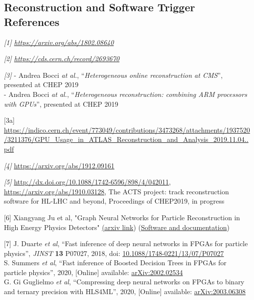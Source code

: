 \documentclass[10pt,a4paper]{article}
\begin{document}
\subsection{Reconstruction and Software Trigger References}\label{references-rst}


\emph{{[}1{]}
\href{https://arxiv.org/abs/1802.08640}{{https://arxiv.org/abs/1802.08640}}}

\emph{{[}2{]}
\href{https://cds.cern.ch/record/2693670}{{https://cds.cern.ch/record/2693670}}}

\emph{{[}3{]}} - Andrea Bocci \emph{at al.}, ``\emph{Heterogeneous
online reconstruction at CMS}'', presented at CHEP 2019\\
- Andrea Bocci \emph{at al.}, ``\emph{Heterogeneous reconstruction:
combining ARM processors with GPUs}'', presented at CHEP 2019

{[}3a{]}
\href{https://indico.cern.ch/event/773049/contributions/3473268/attachments/1937520/3211376/GPU_Usage_in_ATLAS_Reconstruction_and_Analysis_2019.11.04..pdf}{{https://indico.cern.ch/event/773049/contributions/3473268/attachments/1937520/3211376/GPU\_Usage\_in\_ATLAS\_Reconstruction\_and\_Analysis\_2019.11.04..pdf}}

\emph{{[}4{]}}
\href{https://arxiv.org/abs/1912.09161}{{https://arxiv.org/abs/1912.09161}}

\emph{{[}5{]}}
\href{http://dx.doi.org/10.1088/1742-6596/898/4/042011}{{http://dx.doi.org/10.1088/1742-6596/898/4/042011}},
\href{https://arxiv.org/abs/1910.03128}{{https://arxiv.org/abs/1910.03128}},
The ACTS project: track reconstruction software for HL-LHC and beyond,
Proceedings of CHEP2019, in progress

{[}6{]} Xiangyang Ju et al, "Graph Neural Networks for Particle
Reconstruction in High Energy Physics Detectors"
\href{https://arxiv.org/abs/2003.11603}{{(arxiv link}})
(\href{https://github.com/exatrkx/exatrkx-neurips19}{{Software and
documentation}})

{[}7{]} J. Duarte \emph{et al}, ``Fast inference of deep neural networks
in FPGAs for particle physics'', \emph{JINST} \textbf{13} P07027, 2018,
doi:
\href{https://iopscience.iop.org/article/10.1088/1748-0221/13/07/P07027/meta}{{10.1088/1748-0221/13/07/P07027}}\\
S. Summers \emph{et al}, ``Fast inference of Boosted Decision Trees in
FPGAs for particle physics'', 2020, {[}Online{]} available:
\href{https://arxiv.org/abs/2002.02534}{{arXiv:2002.02534}}\\
G. Gi Guglielmo \emph{et al}, ``Compressing deep neural networks on
FPGAs to binary and ternary precision with HLS4ML'', 2020, {[}Online{]}
available: \href{https://arxiv.org/abs/2003.06308}{{arXiv:2003.06308}}
\end{document}
